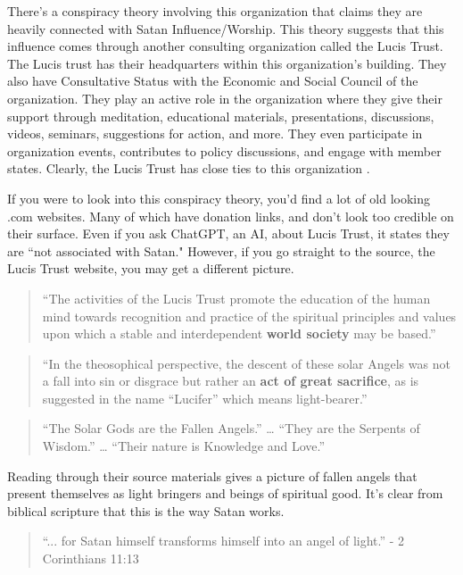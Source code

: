\documentclass[9.5pt]{article}
\begin{document}
\begin{multicols}{2}
There's a conspiracy theory involving this organization that claims they are heavily connected with Satan Influence/Worship. This theory suggests that this influence comes through another consulting organization called the Lucis Trust. The Lucis trust has their headquarters within this organization's building. They also have Consultative Status with the Economic and Social Council of the organization. They play an active role in the organization where they give their support through meditation, educational materials, presentations, discussions, videos, seminars, suggestions for action, and more. They even participate in organization events, contributes to policy discussions, and engage with member states. Clearly, the Lucis Trust has close ties to this organization \cite{LTAboutUs}.

If you were to look into this conspiracy theory, you'd find a lot of old looking .com websites. Many of which have donation links, and don't look too credible on their surface. Even if you ask ChatGPT, an AI, about Lucis Trust, it states they are ``not associated with Satan." However, if you go straight to the source, the Lucis Trust website, you may get a different picture.

\begin{quotation}
``The activities of the Lucis Trust promote the education of the human mind towards recognition and practice of the spiritual principles and values upon which a stable and interdependent \textbf{world society} may be based.” \cite{LTAboutUs}
\end{quotation}

\begin{quotation}
``In the theosophical perspective, the descent of these solar Angels was not a fall into sin or disgrace but rather an \textbf{act of great sacrifice}, as is suggested in the name “Lucifer” which means light-bearer.” \cite{LTAboutUs}
\end{quotation}

\begin{quotation}
“The Solar Gods are the Fallen Angels.” … “They are the Serpents of Wisdom.” … “Their nature is Knowledge and Love.” \cite{LTAboutUs}
\end{quotation}

Reading through their source materials gives a picture of fallen angels that present themselves as light bringers and beings of spiritual good. It's clear from biblical scripture that this is the way Satan works.

\begin{quotation}
``... for Satan himself transforms himself into an angel of light.” - 2 Corinthians 11:13
\end{quotation}


\end{multicols}
\end{document}

